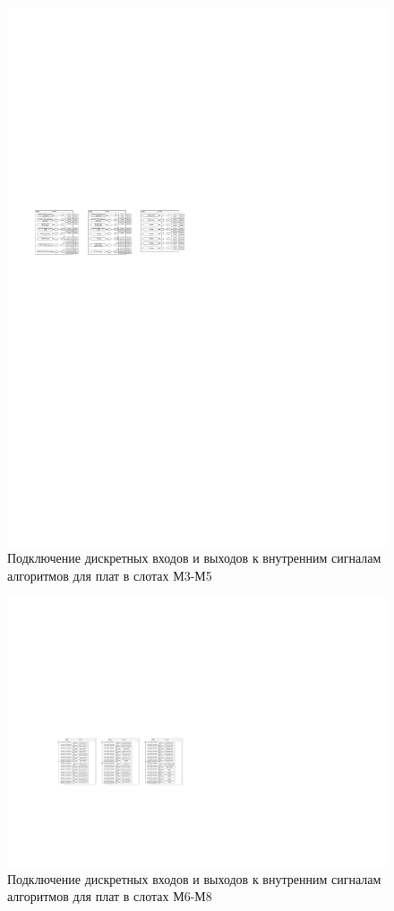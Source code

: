\documentclass[a4paper, 12pt,table, hidelinks, DIV=calc]{extarticle} %
\begin{document}
\begin{appendices}
\begin{landscape}
\begin{figure}[h!]
  \centering
  \includegraphics[width=1.45\textwidth]{img45.pdf}
  \caption{Подключение дискретных входов и выходов к внутренним сигналам алгоритмов для плат в слотах М3-М5}
  \label{fig:sig2} %
\end{figure}

\begin{figure}[h!]
  \centering
  \includegraphics[width=1.4\textwidth]{img46.pdf}
  \caption{Подключение дискретных входов и выходов к внутренним сигналам алгоритмов для плат в слотах М6-М8}
  \label{fig:sig3} %
\end{figure}


\end{landscape}
\end{appendices}
\end{document}
